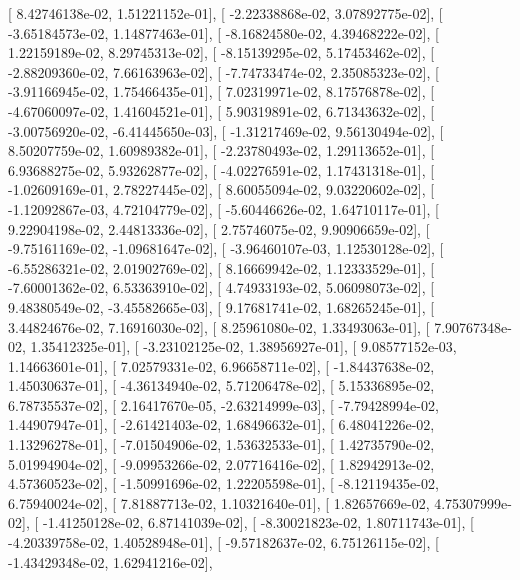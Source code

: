 \documentclass{article}
\begin{document}
       [  8.42746138e-02,   1.51221152e-01],
       [ -2.22338868e-02,   3.07892775e-02],
       [ -3.65184573e-02,   1.14877463e-01],
       [ -8.16824580e-02,   4.39468222e-02],
       [  1.22159189e-02,   8.29745313e-02],
       [ -8.15139295e-02,   5.17453462e-02],
       [ -2.88209360e-02,   7.66163963e-02],
       [ -7.74733474e-02,   2.35085323e-02],
       [ -3.91166945e-02,   1.75466435e-01],
       [  7.02319971e-02,   8.17576878e-02],
       [ -4.67060097e-02,   1.41604521e-01],
       [  5.90319891e-02,   6.71343632e-02],
       [ -3.00756920e-02,  -6.41445650e-03],
       [ -1.31217469e-02,   9.56130494e-02],
       [  8.50207759e-02,   1.60989382e-01],
       [ -2.23780493e-02,   1.29113652e-01],
       [  6.93688275e-02,   5.93262877e-02],
       [ -4.02276591e-02,   1.17431318e-01],
       [ -1.02609169e-01,   2.78227445e-02],
       [  8.60055094e-02,   9.03220602e-02],
       [ -1.12092867e-03,   4.72104779e-02],
       [ -5.60446626e-02,   1.64710117e-01],
       [  9.22904198e-02,   2.44813336e-02],
       [  2.75746075e-02,   9.90906659e-02],
       [ -9.75161169e-02,  -1.09681647e-02],
       [ -3.96460107e-03,   1.12530128e-02],
       [ -6.55286321e-02,   2.01902769e-02],
       [  8.16669942e-02,   1.12333529e-01],
       [ -7.60001362e-02,   6.53363910e-02],
       [  4.74933193e-02,   5.06098073e-02],
       [  9.48380549e-02,  -3.45582665e-03],
       [  9.17681741e-02,   1.68265245e-01],
       [  3.44824676e-02,   7.16916030e-02],
       [  8.25961080e-02,   1.33493063e-01],
       [  7.90767348e-02,   1.35412325e-01],
       [ -3.23102125e-02,   1.38956927e-01],
       [  9.08577152e-03,   1.14663601e-01],
       [  7.02579331e-02,   6.96658711e-02],
       [ -1.84437638e-02,   1.45030637e-01],
       [ -4.36134940e-02,   5.71206478e-02],
       [  5.15336895e-02,   6.78735537e-02],
       [  2.16417670e-05,  -2.63214999e-03],
       [ -7.79428994e-02,   1.44907947e-01],
       [ -2.61421403e-02,   1.68496632e-01],
       [  6.48041226e-02,   1.13296278e-01],
       [ -7.01504906e-02,   1.53632533e-01],
       [  1.42735790e-02,   5.01994904e-02],
       [ -9.09953266e-02,   2.07716416e-02],
       [  1.82942913e-02,   4.57360523e-02],
       [ -1.50991696e-02,   1.22205598e-01],
       [ -8.12119435e-02,   6.75940024e-02],
       [  7.81887713e-02,   1.10321640e-01],
       [  1.82657669e-02,   4.75307999e-02],
       [ -1.41250128e-02,   6.87141039e-02],
       [ -8.30021823e-02,   1.80711743e-01],
       [ -4.20339758e-02,   1.40528948e-01],
       [ -9.57182637e-02,   6.75126115e-02],
       [ -1.43429348e-02,   1.62941216e-02],
\end{document}
